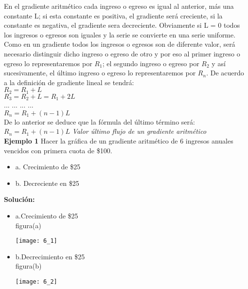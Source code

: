 En el gradiente aritmético cada ingreso o egreso es igual al anterior, más una constante L; si esta constante es positiva, el gradiente será creciente, si la constante es negativa, el gradiente sera decreciente. Obviamente si L = 0 todos los ingresos o egresos son iguales y la serie se convierte en una serie uniforme. Como en un gradiente todos los ingresos o egresos son de diferente valor, será necesario distinguir dicho ingreso o egreso de otro y por eso al primer ingreso o egreso lo representaremos por $R_{1}$; el segundo ingreso o egreso por $R_{2}$ y así sucesivamente, el último ingreso o egreso lo representaremos por $R_{n}$. De acuerdo a la definición de gradiente lineal se tendrá:\\

$R_{2} = R_{1} + L$\\
$R_{3} = R_{2}  + L  = R_{1} + 2L$\\
... ... ... ... \\
$R_{n} = R_{1} + (n-1)L$\\
De lo anterior se deduce que la fórmula del último término será:\\
$R_{n} = R_{1} + (n-1)L$ \hspace{35 pt} \textit{Valor último flujo de un gradiente aritmético}\\

\textbf{Ejemplo 1}
Hacer la gráfica de un gradiente aritmético de 6 ingresos anuales vencidos con primera cuota de \$100.
\begin{itemize}
	\item a. Crecimiento de \$25
	\item b. Decreciente en \$25
\end{itemize}

\clearpage

\textbf{Solución:}

\begin{itemize}
	\item a.Crecimiento de \$25\\
	figura(a)\\
	\begin{center}
	   \texttt{[image: 6\_1]}			
	\end{center}	
	
	\item b.Decrecimiento en \$25\\
	figura(b)\\
	\begin{center}
		\texttt{[image: 6\_2]}
	\end{center}

\end{itemize}


